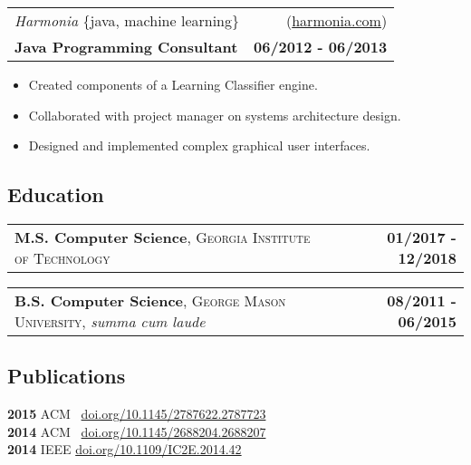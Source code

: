 \documentclass[10pt,letterpaper]{article}
\begin{document}
\vspace{0.25cm}

\noindent\begin{tabularx}{\textwidth}{@{} Xr @{}}
  \textit{Harmonia} \{java, machine learning\} & (\href{https://harmonia.com}{harmonia.com}) \\
  \textbf{Java Programming Consultant} & \textbf{06/2012 - 06/2013}
\end{tabularx}

\begin{itemize}
\item Created components of a Learning Classifier engine.
\item Collaborated with project manager on systems architecture design.
\item Designed and implemented complex graphical user interfaces.
\end{itemize}

\subsection{Education}

\noindent
\begin{tabularx}{\textwidth}{@{} Xr @{}}
  \textbf{M.S. Computer Science}, \textsc{Georgia Institute of Technology} & \textbf{01/2017 - 12/2018}
\end{tabularx}

\noindent
\begin{tabularx}{\textwidth}{@{} Xr @{}}
  \textbf{B.S. Computer Science}, \textsc{George Mason University}, \emph{summa cum laude} & \textbf{08/2011 - 06/2015}
\end{tabularx}

\subsection{Publications}

\noindent
\textbf{2015} ACM \ \href{https://doi.org/10.1145/2787622.2787723}{doi.org/10.1145/2787622.2787723} \\
\textbf{2014} ACM \ \href{https://doi.org/10.1145/2688204.2688207}{doi.org/10.1145/2688204.2688207} \\
\textbf{2014} IEEE  \href{https://doi.org/10.1109/IC2E.2014.42}{doi.org/10.1109/IC2E.2014.42}
\end{document}

